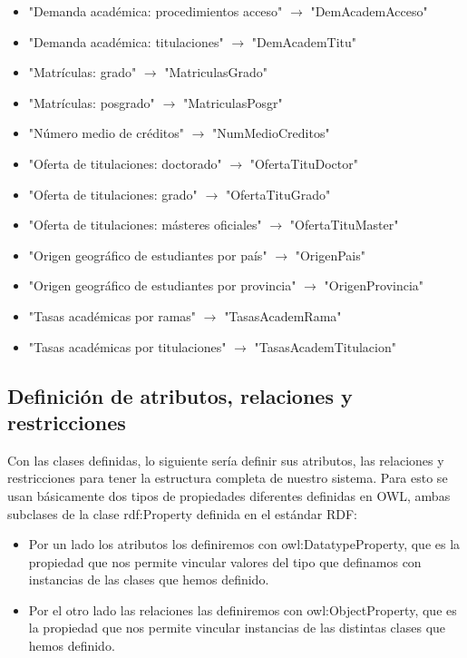 \begin{itemize}
	\item "Demanda académica: procedimientos acceso"  $\rightarrow$  "DemAcademAcceso"
	\item "Demanda académica: titulaciones"  $\rightarrow$  "DemAcademTitu"
	\item "Matrículas: grado"  $\rightarrow$  "MatriculasGrado"
	\item "Matrículas: posgrado"  $\rightarrow$  "MatriculasPosgr"
	\item "Número medio de créditos"  $\rightarrow$  "NumMedioCreditos"
	\item "Oferta de titulaciones: doctorado"  $\rightarrow$  "OfertaTituDoctor"
	\item "Oferta de titulaciones: grado"  $\rightarrow$  "OfertaTituGrado"
	\item "Oferta de titulaciones: másteres oficiales"  $\rightarrow$  "OfertaTituMaster"
	\item "Origen geográfico de estudiantes por país"  $\rightarrow$  "OrigenPais"
	\item "Origen geográfico de estudiantes por provincia"  $\rightarrow$  "OrigenProvincia"
	\item "Tasas académicas por ramas"  $\rightarrow$  "TasasAcademRama"
	\item "Tasas académicas por titulaciones"  $\rightarrow$  "TasasAcademTitulacion"
\end{itemize}

\subsection{Definición de atributos, relaciones y restricciones}

Con las clases definidas, lo siguiente sería definir sus atributos, las relaciones y restricciones para tener la estructura completa de nuestro sistema. Para esto se usan básicamente dos tipos de propiedades diferentes definidas en OWL, ambas subclases de la clase rdf:Property definida en el estándar RDF:

\begin{itemize}
	\item Por un lado los atributos los definiremos con owl:DatatypeProperty, que es la propiedad que nos permite vincular valores del tipo que definamos con instancias de las clases que hemos definido.
	\item Por el otro lado las relaciones las definiremos con owl:ObjectProperty, que es la propiedad que nos permite vincular instancias de las distintas clases que hemos definido.
\end{itemize}
 
